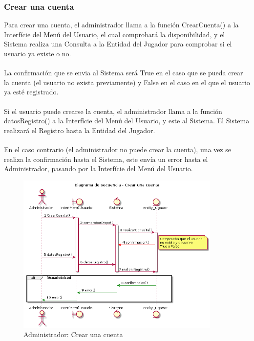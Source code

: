 \subsubsection{Crear una cuenta}
  Para crear una cuenta, el administrador llama a la función CrearCuenta() a la Interfície del Menú del Usuario, el cual comprobará la disponibilidad, y el Sistema realiza una Consulta a la Entidad del Jugador para comprobar si el usuario ya existe o no. \\
  \\La confirmación que se envia al Sistema será True en el caso que se pueda crear la cuenta (el usuario no exista previamente) y False en el caso en el que el usuario ya esté registrado.\\
  \\Si el usuario puede crearse la cuenta, el administrador llama a la función datosRegistro() a la Interfície del Menú del Usuario, y este al Sistema. El Sistema realizará el Registro hasta la Entidad del Jugador.\\
  \\En el caso contrario (el administrador no puede crear la cuenta), una vez se realiza la confirmación hasta el Sistema, este envía un error hasta el Administrador, pasando por la Interfície del Menú del Usuario.
\begin{figure} [ht]
	\centering
	\includegraphics[width=0.9\textwidth]{./imatges/administrador/Crear_una_cuenta.png}
	\caption{Administrador: Crear una cuenta}
\end{figure}


\newpage
